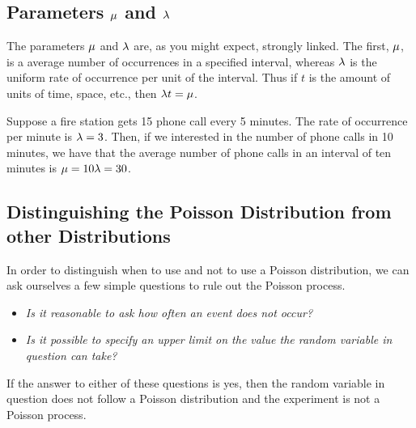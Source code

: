 \subsection{Parameters $\mu$ and $\lambda$}
The parameters $\mu$ and $\lambda$ are, as you might expect, strongly linked. The first, $\mu$, is a average number of occurrences in a specified interval, whereas $\lambda$ is the uniform rate of occurrence per unit of the interval. Thus if $t$ is the amount of units of time, space, etc., then $\lambda t = \mu$.
\begin{example}
    Suppose a fire station gets 15 phone call every 5 minutes. The rate of occurrence per minute is $\lambda = 3$. Then, if we interested in the number of phone calls in 10 minutes, we have that the average number of phone calls in an interval of ten minutes is $\mu = 10\lambda = 30$.
\end{example}
\subsection{Distinguishing the Poisson Distribution from other Distributions}
In order to distinguish when to use and not to use a Poisson distribution, we can ask ourselves a few simple questions to rule out the Poisson process.
\begin{itemize}
    \item \textit{Is it reasonable to ask how often an event does not occur?}
    \item \textit{Is it possible to specify an upper limit on the value the random variable in question can take?}
\end{itemize}
If the answer to either of these questions is yes, then the random variable in question does not follow a Poisson distribution and the experiment is not a Poisson process.
